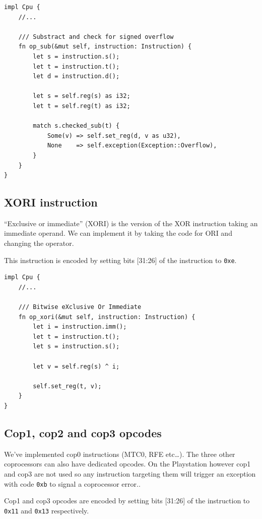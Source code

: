 \documentclass[a4paper]{article}
\newcommand{\code}[1] {\texttt{#1}}
\begin{document}
\begin{lstlisting}
impl Cpu {
    //...

    /// Substract and check for signed overflow
    fn op_sub(&mut self, instruction: Instruction) {
        let s = instruction.s();
        let t = instruction.t();
        let d = instruction.d();

        let s = self.reg(s) as i32;
        let t = self.reg(t) as i32;

        match s.checked_sub(t) {
            Some(v) => self.set_reg(d, v as u32),
            None    => self.exception(Exception::Overflow),
        }
    }
}
\end{lstlisting}

\subsection{XORI instruction}

``Exclusive or immediate'' (XORI) is the version of the XOR
instruction taking an immediate operand. We can implement it by taking
the code for ORI and changing the operator.

This instruction is encoded by setting bits [31:26] of the
instruction to \code{0xe}.

\begin{lstlisting}
impl Cpu {
    //...

    /// Bitwise eXclusive Or Immediate
    fn op_xori(&mut self, instruction: Instruction) {
        let i = instruction.imm();
        let t = instruction.t();
        let s = instruction.s();

        let v = self.reg(s) ^ i;

        self.set_reg(t, v);
    }
}
\end{lstlisting}

\subsection{Cop1, cop2 and cop3 opcodes}

We've implemented cop0 instructions (MTC0, RFE etc\dots{}). The three
other coprocessors can also have dedicated opcodes. On the Playstation
however cop1 and cop3 are not used so any instruction targeting them
will trigger an exception with code \code{0xb} to signal a coprocessor
error..

Cop1 and cop3 opcodes are encoded by setting bits [31:26] of the
instruction to \code{0x11} and \code{0x13} respectively.
\end{document}
